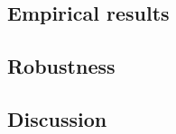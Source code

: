 \label{sec:results}
\subsection{Empirical results}
\label{subsec:results}

\subsection{Robustness}


\subsection{Discussion}
\label{subsec:discussion}
